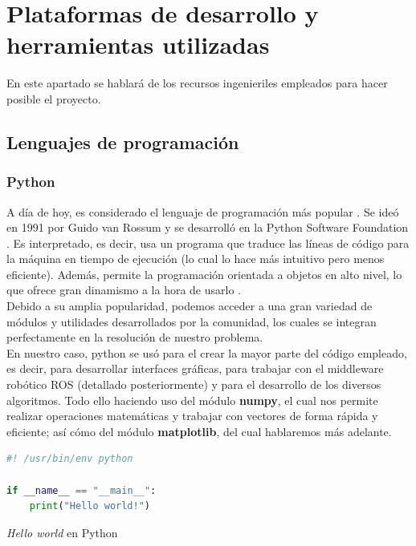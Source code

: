 \chapter{Plataformas de desarrollo y herramientas utilizadas}
\label{cap:capitulo3}

En este apartado se hablará de los recursos ingenieriles empleados para hacer posible el proyecto.

\section{Lenguajes de programación}
\label{sec:lenguajes_programacion}

\subsection{Python}
\label{subsec:python}

A día de hoy, es considerado el lenguaje de programación más popular \cite{tiobe}. Se ideó en 1991 por Guido van Rossum y se desarrolló en la Python Software Foundation \cite{python-history}. Es interpretado, es decir, usa un programa que traduce las líneas de código para la máquina en tiempo de ejecución (lo cual lo hace más intuitivo pero menos eficiente). Además, permite la programación orientada a objetos en alto nivel, lo que ofrece gran dinamismo a la hora de usarlo \cite{python-def} \cite{compiled-vs-interpreted}.\\

Debido a su amplia popularidad, podemos acceder a una gran variedad de módulos y utilidades desarrollados por la comunidad, los cuales se integran perfectamente en la resolución de nuestro problema.\\

En nuestro caso, python se usó para el crear la mayor parte del código empleado, es decir, para desarrollar interfaces gráficas, para trabajar con el middleware robótico \ac{ROS} (detallado posteriormente) y para el desarrollo de los diversos algoritmos. Todo ello haciendo uso del módulo \textbf{numpy}, el cual nos permite realizar operaciones matemáticas y trabajar con vectores de forma rápida y eficiente; así cómo del módulo \textbf{matplotlib}, del cual hablaremos más adelante.\\

\begin{code}[H]
\begin{lstlisting}[language=Python]
#! /usr/bin/env python

if __name__ == "__main__":
    print("Hello world!")
\end{lstlisting}
\caption[Hello world en Python]{\emph{Hello world} en Python}
\label{cod:helloworld_python}
\end{code}

